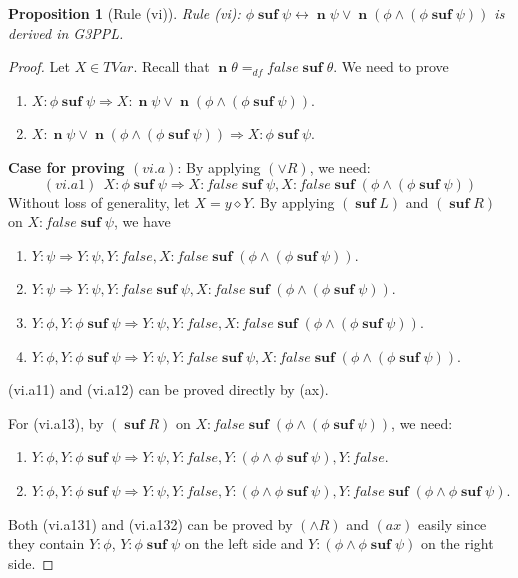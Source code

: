 \documentclass[manuscript,screen]{acmart}
\newtheorem{prop}{Proposition}[section]
\newcommand{\dddef}[0]{=_{df}}
\newcommand{\true}[0]{\mathit{true}}
\newcommand{\false}[0]{\mathit{false}}
\newcommand{\cat}[0]{\diamond}
\newcommand{\GiiiPPLcyc}[0]{\mbox{G3PPL}}
\DeclareMathOperator{\osuf}{\mathbf{suf}}
\newcommand{\TVar}[0]{\textit{TVar}}
\DeclareMathOperator{\nxt}{\mathbf{n}}
\begin{document}
\begin{prop}[Rule (vi)]
Rule (vi):
$\phi\osuf \psi\leftrightarrow \nxt \psi \vee \nxt (\phi\wedge (\phi\osuf \psi))$
is derived in \GiiiPPLcyc. 
\end{prop}

\begin{proof}
Let $X\in \TVar$. 
Recall that $\nxt \theta \dddef \false\osuf \theta$.
We need to prove
\begin{enumerate}
\item[$(vi.a)$] $X : \phi\osuf \psi\Rightarrow X : \nxt \psi \vee \nxt (\phi\wedge (\phi\osuf \psi))$.
\item[$(vi.b)$] $X : \nxt \psi \vee \nxt (\phi\wedge (\phi\osuf \psi))\Rightarrow X : \phi\osuf \psi$.
\end{enumerate}

\textbf{Case for proving $(vi.a)$}: 
By applying $(\vee R)$, we need:
$$
(vi.a1)\ \ X : \phi\osuf\psi\Rightarrow X : \false\osuf\psi, X : \false\osuf(\phi\wedge(\phi\osuf\psi))
$$
Without loss of generality, let $X = y\cat Y$. 
By applying $(\osuf L)$ and $(\osuf R)$ on $X : \false\osuf \psi$, we have
\begin{enumerate}
\item[(vi.a11)] $Y : \psi\Rightarrow Y : \psi, Y : \false, X : \false\osuf(\phi\wedge(\phi\osuf\psi))$. 
\item[(vi.a12)] $Y : \psi\Rightarrow Y : \psi, Y : \false\osuf \psi, X : \false\osuf(\phi\wedge(\phi\osuf\psi))$. 
\item[(vi.a13)] $Y : \phi, Y : \phi\osuf \psi\Rightarrow Y : \psi, Y : \false, X : \false\osuf(\phi\wedge(\phi\osuf\psi))$. 
\item[(vi.a14)] $Y : \phi, Y : \phi\osuf \psi\Rightarrow Y : \psi, Y : \false\osuf \psi, X : \false\osuf(\phi\wedge(\phi\osuf\psi))$. 
\end{enumerate}
(vi.a11) and (vi.a12) can be proved directly by (ax). 

For (vi.a13), by $(\osuf R)$ on $X : \false\osuf(\phi\wedge(\phi\osuf\psi))$, we need:
\begin{enumerate}
\item[(vi.a131)] $Y : \phi, Y : \phi\osuf \psi\Rightarrow Y : \psi, Y : \false, Y : (\phi\wedge \phi\osuf\psi), Y : \false$. 
\item[(vi.a132)] $Y : \phi, Y : \phi\osuf \psi\Rightarrow Y : \psi, Y : \false, Y : (\phi\wedge \phi\osuf\psi), Y : \false\osuf (\phi\wedge \phi\osuf \psi)$.
\end{enumerate}
Both (vi.a131) and (vi.a132) can be proved by $(\wedge R)$ and $(ax)$ easily since they contain $Y : \phi$, $Y : \phi\osuf \psi$ on the left side and $Y : (\phi\wedge \phi\osuf \psi)$ on the right side. 


\end{proof}
\end{document}

